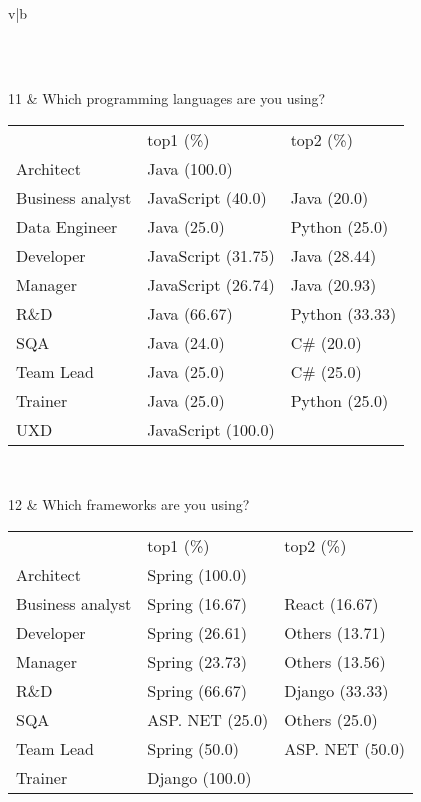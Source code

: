 \begin{table}[htbp]
\begin{tabularx}{\textwidth}{v|b}
{\begin{tabularx}{0.92\textwidth}{yyy}
        \end{tabularx}
        }\\ \hline
        
        11 & Which programming languages are you using?\newline
        {
        \begin{tabularx}{0.92\textwidth}{yyy}
         & top1 (\%) & top2 (\%) \\
        Architect & Java (100.0)  &  \\
        Business analyst & JavaScript (40.0)  & Java (20.0)  \\
        Data Engineer & Java (25.0)  & Python (25.0)  \\
        Developer & JavaScript (31.75)  & Java (28.44)  \\
        Manager & JavaScript (26.74)  & Java (20.93)  \\
        R\&D & Java (66.67)  & Python (33.33)  \\
        SQA & Java (24.0)  & C\# (20.0)  \\
        Team Lead & Java (25.0)  & C\# (25.0)  \\
        Trainer & Java (25.0)  & Python (25.0)  \\
        UXD & JavaScript (100.0)  &  \\
        \end{tabularx}
        }\\ \hline
        
        12 & Which frameworks are you using? \newline
        {
        \begin{tabularx}{0.92\textwidth}{yyy}
         & top1 (\%) & top2 (\%) \\
        Architect & Spring (100.0)  &  \\
        Business analyst & Spring (16.67)  & React (16.67)  \\
        Developer & Spring (26.61)  & Others (13.71)  \\
        Manager & Spring (23.73)  & Others (13.56)  \\
        R\&D & Spring (66.67)  & Django (33.33)  \\
        SQA & ASP. NET (25.0)  & Others (25.0)  \\
        Team Lead & Spring (50.0)  & ASP. NET (50.0)  \\
        Trainer & Django (100.0)  &  \\

        \end{tabularx}
        }\\ \hline
        
    \end{tabularx} 
    \label{table:analysis by profession part2}
\end{table}
